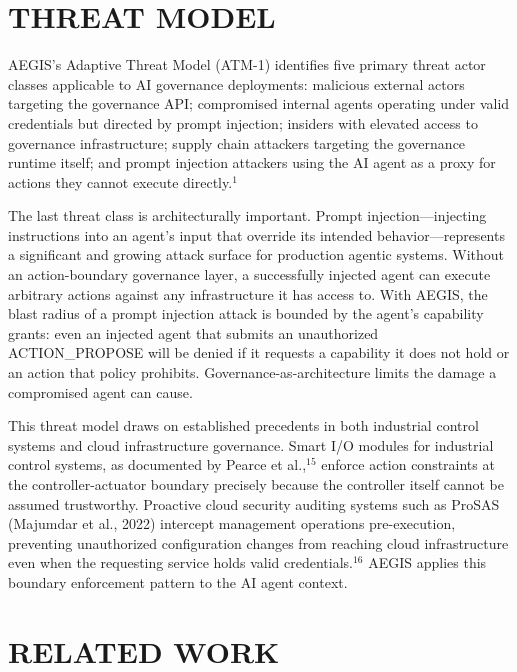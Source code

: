 \documentclass{IEEEcsmag}
\begin{document}
\section{THREAT MODEL}

AEGIS's Adaptive Threat Model (ATM-1) identifies five primary threat actor classes applicable to AI governance deployments: malicious external actors targeting the governance API; compromised internal agents operating under valid credentials but directed by prompt injection; insiders with elevated access to governance infrastructure; supply chain attackers targeting the governance runtime itself; and prompt injection attackers using the AI agent as a proxy for actions they cannot execute directly.$^{1}$

The last threat class is architecturally important. Prompt injection---injecting instructions into an agent's input that override its intended behavior---represents a significant and growing attack surface for production agentic systems. Without an action-boundary governance layer, a successfully injected agent can execute arbitrary actions against any infrastructure it has access to. With AEGIS, the blast radius of a prompt injection attack is bounded by the agent's capability grants: even an injected agent that submits an unauthorized ACTION\_PROPOSE will be denied if it requests a capability it does not hold or an action that policy prohibits. Governance-as-architecture limits the damage a compromised agent can cause.

This threat model draws on established precedents in both industrial control systems and cloud infrastructure governance. Smart I/O modules for industrial control systems, as documented by Pearce et al.,$^{15}$ enforce action constraints at the controller-actuator boundary precisely because the controller itself cannot be assumed trustworthy. Proactive cloud security auditing systems such as ProSAS (Majumdar et al., 2022) intercept management operations pre-execution, preventing unauthorized configuration changes from reaching cloud infrastructure even when the requesting service holds valid credentials.$^{16}$ AEGIS applies this boundary enforcement pattern to the AI agent context.

\section{RELATED WORK}

\begin{table}[!t]
\centering
\caption{Differentiation of AEGIS from representative related work across five governance dimensions: action-boundary enforcement, federated trust, tamper-evident audit, NIST AI RMF alignment, and open specification.}
\label{tab:relatedwork}
\end{table}
\end{document}
